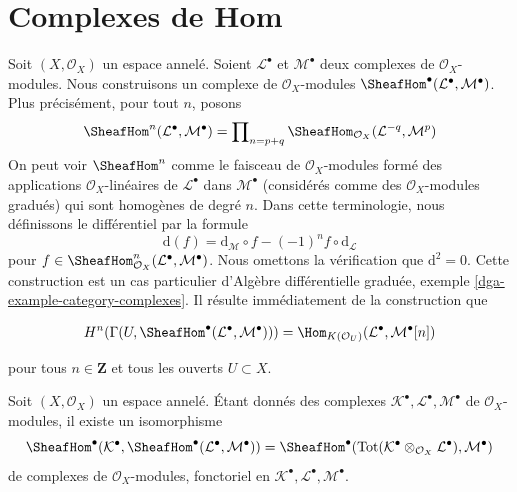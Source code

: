 \section{Complexes de Hom}

\label{section-hom-complexes}

\noindent

Soit $(X, \mathcal{O}_X)$ un espace annelé. Soient
$\mathcal{L}^\bullet$ et $\mathcal{M}^\bullet$ deux complexes de $\mathcal{O}_X$-modules. Nous construisons un complexe de $\mathcal{O}_X$-modules
$\SheafHom^\bullet(\mathcal{L}^\bullet, \mathcal{M}^\bullet)$. Plus précisément, pour tout $n$, posons
$$
\SheafHom^n(\mathcal{L}^\bullet, \mathcal{M}^\bullet) =
\prod\nolimits_{n = p + q}
\SheafHom_{\mathcal{O}_X}(\mathcal{L}^{-q}, \mathcal{M}^p)
$$
On peut voir $\SheafHom^n$ comme le faisceau de $\mathcal{O}_X$-modules formé des applications $\mathcal{O}_X$-linéaires de $\mathcal{L}^\bullet$ dans $\mathcal{M}^\bullet$
(considérés comme des $\mathcal{O}_X$-modules gradués) qui sont homogènes de degré $n$. Dans cette terminologie, nous définissons le différentiel par la formule
$$
\text{d}(f) =
\text{d}_\mathcal{M} \circ f - (-1)^n f \circ \text{d}_\mathcal{L}
$$
pour
$f \in \SheafHom^n_{\mathcal{O}_X}(\mathcal{L}^\bullet, \mathcal{M}^\bullet)$. Nous omettons la vérification que $\text{d}^2 = 0$. Cette construction est un cas particulier d'Algèbre différentielle graduée, exemple \ref{dga-example-category-complexes}. Il résulte immédiatement de la construction que

\begin{equation}
\label{equation-cohomology-hom-complex}
H^n(\Gamma(U, \SheafHom^\bullet(\mathcal{L}^\bullet, \mathcal{M}^\bullet))) =
\Hom_{K(\mathcal{O}_U)}(\mathcal{L}^\bullet, \mathcal{M}^\bullet[n])
\end{equation}

pour tous $n \in \mathbf{Z}$ et tous les ouverts $U \subset X$.

\begin{lemma}

\label{lemma-compose}
Soit $(X, \mathcal{O}_X)$ un espace annelé. Étant donnés des complexes $\mathcal{K}^\bullet, \mathcal{L}^\bullet, \mathcal{M}^\bullet$ de $\mathcal{O}_X$-modules, il existe un isomorphisme $$
\SheafHom^\bullet(\mathcal{K}^\bullet,
\SheafHom^\bullet(\mathcal{L}^\bullet, \mathcal{M}^\bullet))
=
\SheafHom^\bullet(\text{Tot}(\mathcal{K}^\bullet \otimes_{\mathcal{O}_X}
\mathcal{L}^\bullet), \mathcal{M}^\bullet)
$$ de complexes de $\mathcal{O}_X$-modules, fonctoriel en $\mathcal{K}^\bullet, \mathcal{L}^\bullet, \mathcal{M}^\bullet$.
\end{lemma}

